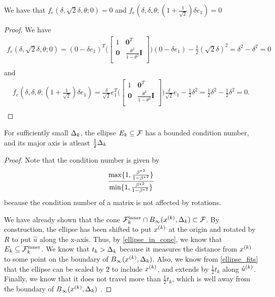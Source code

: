 \begin{theorem}
\label{ellipse_fits}
We have that $f_e(\delta, \sqrt{2}\delta, \theta; 0) = 0$ and $f_e(\delta, \delta, \theta; (1 + \frac{1}{\sqrt{2}}) \delta e_1) = 0$
\end{theorem}
\begin{proof}

We have
\begin{align*}
f_e(\delta, \sqrt{2}\delta, \theta; 0) =(0 - \delta e_1)^T\bigg(\begin{bmatrix}
1 & \boldsymbol0^T \\
\boldsymbol 0 & \frac{\theta^2}{1 - \theta^2} \boldsymbol I \\
\end{bmatrix}\bigg)(0 - \delta e_1) - \frac 1 2 (\sqrt 2 \delta)^2
=\delta^2 - \delta^2 = 0\\
\end{align*}
and
\begin{align*}
f_e(\delta, \delta, \theta; (1 + \frac{1}{\sqrt{2}}) \delta e_1) =\frac {\delta}{\sqrt{2}}e_1^T\bigg(\begin{bmatrix}
1 & \boldsymbol0^T \\
\boldsymbol 0 & \frac{\theta^2}{1 - \theta^2} \boldsymbol I \\
\end{bmatrix}\bigg)\frac {\delta}{\sqrt{2}}e_1 - \frac 1 2 \delta^2
=\frac 1 2 \delta^2 - \frac 1 2 \delta^2 = 0.\\
\end{align*}

\end{proof}

\begin{theorem}
For sufficiently small $\Delta_k$, the ellipse $E_k \subseteq {\mathcal F}$ has a bounded condition number, and its major axis is atleast $\frac 1 2 \Delta_k$
\end{theorem}

\begin{proof}
Note that the condition number is given by
\begin{align*}
\frac{\max\{1, \frac{{\beta^{\star}}^2}{1 - {\beta^{\star}}^2}\}}{\min\{1, \frac{{\beta^{\star}}^2}{1 - {\beta^{\star}}^2}\}}
\end{align*}
because the condition number of a matrix is not affected by rotations.

We have already shown that the cone ${\mathcal {F}^{\text{inner}}_k} \cap B_{\infty}({x^{(k)}}, \Delta_k) \subset {\mathcal F}$.
By construction, the ellipse has been shifted to put ${x^{(k)}}$ at the origin and rotated by $R$ to put $\hat u$ along the x-axis.
Thus, by \cref{ellipse_in_cone}, we know that $E_k \subseteq {\mathcal {F}^{\text{inner}}_k}$.
We know that $t_k > \Delta_k$ because it measures the distance from ${x^{(k)}}$ to some point on the boundary of $B_{\infty}({x^{(k)}}, \Delta_k)$.
Also, we know from \cref{ellipse_fits} that the ellipse can be scaled by $2$ to include ${x^{(k)}}$, and extends by $\frac 1 2 t_k$ along ${{\hat u}^{(k)}}$.
Finally, we know that it does not travel more than $\frac 1 2 t_k$, \color{red} which is well away from the boundary of $B_{\infty}({x^{(k)}}, \Delta_k)$ \color{black}.
\end{proof}


